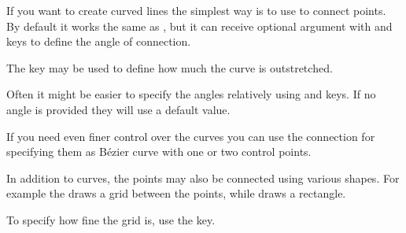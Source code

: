 If you want to create curved lines the simplest way is to use  to
connect points. By default it works the same as \ltx{--}, but it can receive
optional argument with  and  keys to define the angle of
connection.
\begin{example}[vertical_mode, examplewidth=0.8\linewidth]
\tikzset{baseline} \vspace{-0.3cm} %
\vspace{-0.5cm} %
\end{example}
The  key may be used to define how much the curve is outstretched.
\begin{example}[vertical_mode, examplewidth=0.8\linewidth]
\tikzset{baseline} \vspace{-1cm} %
\vspace{-1cm} %
\end{example}
Often it might be easier to specify the angles relatively using  and  keys. If no angle is provided they will use a
default value.
\begin{example}[vertical_mode, examplewidth=0.8\linewidth]
\end{example}

If you need even finer control over the curves you can use the
 connection for specifying them as Bézier curve with one
or two control points.
\begin{chktexignore}  
\begin{example}[vertical_mode, examplewidth=0.8\linewidth]
\vspace{-0.5cm} %
\end{example}
\end{chktexignore}

In addition to curves, the points may also be connected using various shapes.
For example the  draws a grid between the points, while
 draws a rectangle.
\begin{example}[vertical_mode, examplewidth=0.8\linewidth]
\end{example}
To specify how fine the grid is, use the  key.
\begin{example}[vertical_mode, examplewidth=0.8\linewidth]
\end{example}

